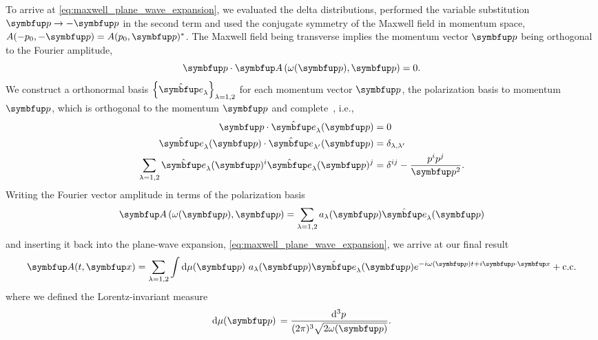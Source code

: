 To arrive at \cref{eq:maxwell_plane_wave_expansion}, we evaluated the delta distributions, performed the variable substitution $\vb{p}\to-\vb{p}$ in the second term and used the conjugate symmetry of the Maxwell field in momentum space, $A(-p_0,-\vb{p})=A(p_0,\vb{p})^*$.
The Maxwell field being transverse implies the momentum vector $\vb{p}$ being orthogonal to the Fourier amplitude,
\begin{equation}
	\vb{p}
	\vdot
	\vb{A}\left(\omega(\vb{p}),\vb{p}\right)
	=
	0
	.
\end{equation}
We construct a orthonormal basis $\left\{\vu{e}_\lambda\right\}_{\lambda=1,2}$ for each momentum vector $\vb{p}$, the polarization basis to momentum $\vb{p}$, which is orthogonal to the momentum $\vb{p}$ and complete~\cite[p.~341]{Srednicki2007}, i.e.,
\begin{align}
	\vb{p}
	\vdot
	\vu{e}_\lambda(\vb{p})
	&=
	0
	\\
	\vu{e}_\lambda(\vb{p})
	\vdot
	\vu{e}_{\lambda^\prime}(\vb{p})
	&=
	\delta_{\lambda,\lambda^\prime}
	\\
	\sum_{\lambda=1,2}
	\vu{e}_\lambda(\vb{p})^i
	\vu{e}_\lambda(\vb{p})^j
	&=
	\delta^{ij}
	-
	\frac{p^ip^j}{\vb{p}^2}
	.
\end{align}
Writing the Fourier vector amplitude in terms of the polarization basis
\begin{equation}
	\vb{A}\left(\omega(\vb{p}),\vb{p}\right)
	=
	\sum_{\lambda=1,2}
	a_\lambda(\vb{p})
	\vu{e}_\lambda(\vb{p})
\end{equation}
and inserting it back into the plane-wave expansion, \cref{eq:maxwell_plane_wave_expansion}, we arrive at our final result
\begin{equation}
	\vb{A}(t,\vb{x})
	=
	\sum_{\lambda=1,2}
	\int\dd{\mu(\vb{p})}
	a_\lambda(\vb{p})
	\vu{e}_\lambda(\vb{p})
	e^{-i\omega(\vb{p})t+i\vb{p}\vdot\vb{x}}
	+
	\text{c.c.}
	\label{eq:maxwell_expansion}
\end{equation}
where we defined the Lorentz-invariant measure
\begin{equation}
	\dd{\mu(\vb{p})}
	=
	\frac{\dd[3]{p}}{(2\pi)^3\sqrt{2\omega(\vb{p})}}
	.
\end{equation}




